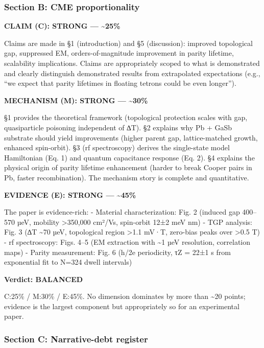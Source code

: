\documentclass[10pt,letterpaper]{article}
\begin{document}
\hypertarget{section-b-cme-proportionality}{%
\subsubsection{Section B: CME proportionality}\label{section-b-cme-proportionality}}

\textbf{CLAIM (C): STRONG --- \textasciitilde25\%}

Claims are made in §1 (introduction) and §5 (discussion): improved topological gap, suppressed EM, orders-of-magnitude improvement in parity lifetime, scalability implications. Claims are appropriately scoped to what is demonstrated and clearly distinguish demonstrated results from extrapolated expectations (e.g., ``we expect that parity lifetimes in floating tetrons could be even longer'').

\textbf{MECHANISM (M): STRONG --- \textasciitilde30\%}

§1 provides the theoretical framework (topological protection scales with gap, quasiparticle poisoning independent of ∆T). §2 explains why Pb + GaSb substrate should yield improvements (higher parent gap, lattice-matched growth, enhanced spin-orbit). §3 (rf spectroscopy) derives the single-state model Hamiltonian (Eq. 1) and quantum capacitance response (Eq. 2). §4 explains the physical origin of parity lifetime enhancement (harder to break Cooper pairs in Pb, faster recombination). The mechanism story is complete and quantitative.

\textbf{EVIDENCE (E): STRONG --- \textasciitilde45\%}

The paper is evidence-rich:
- Material characterization: Fig. 2 (induced gap 400--570 µeV, mobility \textgreater350,000 cm²/Vs, spin-orbit 12±2 meV nm)
- TGP analysis: Fig. 3 (∆T \textasciitilde70 µeV, topological region \textgreater1.1 mV·T, zero-bias peaks over \textgreater0.5 T)
- rf spectroscopy: Figs. 4--5 (EM extraction with \textasciitilde1 µeV resolution, correlation maps)
- Parity measurement: Fig. 6 (h/2e periodicity, τZ = 22±1 s from exponential fit to N=324 dwell intervals)

\textbf{Verdict: BALANCED}

C:25\% / M:30\% / E:45\%. No dimension dominates by more than \textasciitilde20 points; evidence is the largest component but appropriately so for an experimental paper.

\hypertarget{section-c-narrative-debt-register}{%
\subsubsection{Section C: Narrative-debt register}\label{section-c-narrative-debt-register}}
\end{document}

